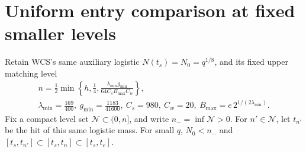 \documentclass[11pt]{article}
\numberwithin{equation}{section}
\theoremstyle{remark}\newtheorem{remark}[theorem]{Remark}
\begin{document}
\section{Uniform entry comparison at fixed smaller levels}
\label{an07psev1:entrysection}
Retain WCS's same auxiliary logistic \(N(t_s)=N_0=q^{1/8}\),
and its fixed upper matching level
\[
 \begin{gathered}
 n=\frac12\min\left\{h,\frac14,
       \frac{\lambda_{\min}g_{\min}}
            {64C_sB_{\max}C_w}\right\},\\
 \lambda_{\min}=\frac{169}{400},\
 g_{\min}=\frac{1183}{41600},\
 C_s=980,\ C_w=20,\ 
 B_{\max}=e\,2^{1/(2\lambda_{\min})}.
 \end{gathered}
 \]
Fix a compact level set \(\mathcal N\subset(0,n]\), and
write \(n_-=\inf\mathcal N>0\).
For \(n'\in\mathcal N\), let \(t_{n'}\) be the hit of this
same logistic mass. For small \(q\), \(N_0<n_-\) and
\([t_s,t_{n'}]\subset[t_s,t_n]\subset[t_s,t_e]\).
\end{document}
